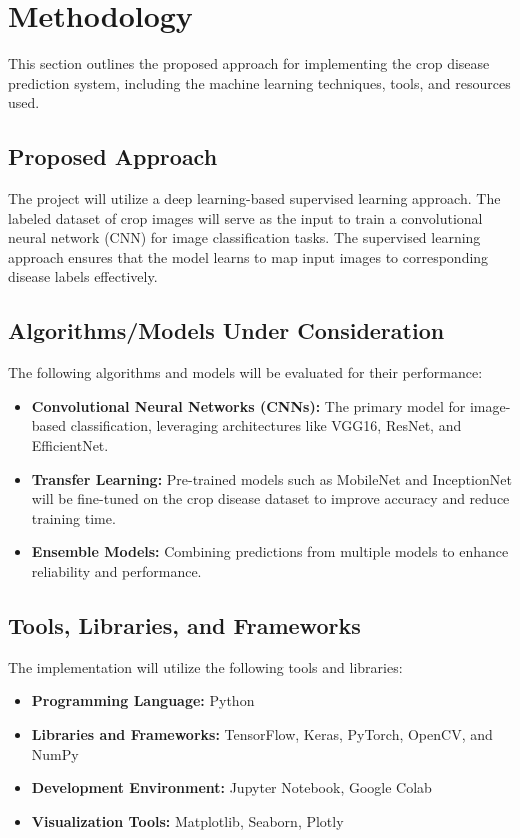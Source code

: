 \section{Methodology}
This section outlines the proposed approach for implementing the crop disease prediction system, including the machine learning techniques, tools, and resources used. 

\subsection{Proposed Approach}
The project will utilize a deep learning-based supervised learning approach. The labeled dataset of crop images will serve as the input to train a convolutional neural network (CNN) for image classification tasks. The supervised learning approach ensures that the model learns to map input images to corresponding disease labels effectively.

\subsection{Algorithms/Models Under Consideration}
The following algorithms and models will be evaluated for their performance:
\begin{itemize}
    \item \textbf{Convolutional Neural Networks (CNNs):} The primary model for image-based classification, leveraging architectures like VGG16, ResNet, and EfficientNet.
    \item \textbf{Transfer Learning:} Pre-trained models such as MobileNet and InceptionNet will be fine-tuned on the crop disease dataset to improve accuracy and reduce training time.
    \item \textbf{Ensemble Models:} Combining predictions from multiple models to enhance reliability and performance.
\end{itemize}

\subsection{Tools, Libraries, and Frameworks}
The implementation will utilize the following tools and libraries:
\begin{itemize}
    \item \textbf{Programming Language:} Python
    \item \textbf{Libraries and Frameworks:} TensorFlow, Keras, PyTorch, OpenCV, and NumPy
    \item \textbf{Development Environment:} Jupyter Notebook, Google Colab
    \item \textbf{Visualization Tools:} Matplotlib, Seaborn, Plotly
\end{itemize}

